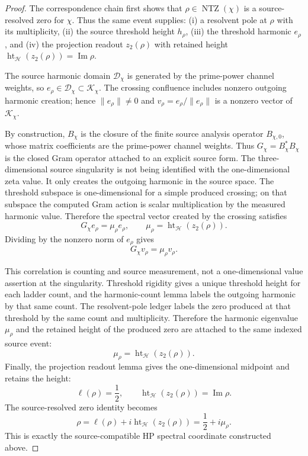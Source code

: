 \documentclass[11pt]{article}
\DeclareMathOperator{\Imm}{Im}
\DeclareMathOperator{\NTZ}{NTZ}
\DeclareMathOperator{\hgt}{ht}
\begin{document}
\begin{proof}
The correspondence chain first shows that $\rho\in\NTZ(\chi)$ is a
source-resolved zero for $\chi$.  Thus the same event supplies:
(i) a resolvent pole at $\rho$ with its multiplicity, (ii) the source threshold
height $h_\rho$, (iii) the threshold harmonic $e_\rho$, and (iv) the projection
readout $z_2(\rho)$ with retained height
$\hgt_{\mathcal H}(z_2(\rho))=\Imm\rho$.

The source harmonic domain $\mathcal D_\chi$ is generated by the prime-power
channel weights, so $e_\rho\in\mathcal D_\chi\subset\mathcal K_\chi$.  The
crossing confluence includes nonzero outgoing harmonic creation; hence
$\|e_\rho\|\ne0$ and $v_\rho=e_\rho/\|e_\rho\|$ is a nonzero vector of
$\mathcal K_\chi$.

By construction, $B_\chi$ is the closure of the finite source analysis operator
$B_{\chi,0}$, whose matrix coefficients are the prime-power channel weights.
Thus $G_\chi=B_\chi^*B_\chi$ is the closed Gram operator attached to an explicit
source form.  The three-dimensional source singularity is not being identified
with the one-dimensional zeta value.  It only creates the outgoing harmonic in
the source space.  The threshold subspace is one-dimensional for a simple
produced crossing; on that subspace the computed Gram action is scalar
multiplication by the measured harmonic value.  Therefore the spectral vector
created by the crossing satisfies
\[
  G_\chi e_\rho=\mu_\rho e_\rho,
  \qquad
  \mu_\rho=\hgt_{\mathcal H}(z_2(\rho)).
\]
Dividing by the nonzero norm of $e_\rho$ gives
\[
  G_\chi v_\rho=\mu_\rho v_\rho .
\]

This correlation is counting and source measurement, not a one-dimensional
value assertion at the singularity.  Threshold rigidity gives
a unique threshold height for each ladder count, and the harmonic-count lemma
labels the outgoing harmonic by that same count.  The resolvent-pole ledger
labels the zero produced at that threshold by the same count and multiplicity.
Therefore the harmonic eigenvalue $\mu_\rho$ and the retained height of the
produced zero are attached to the same indexed source event:
\[
  \mu_\rho=\hgt_{\mathcal H}(z_2(\rho)).
\]
Finally, the projection readout lemma gives the one-dimensional midpoint and
retains the height:
\[
  \ell(\rho)=\frac12,
  \qquad
  \hgt_{\mathcal H}(z_2(\rho))=\Imm\rho .
\]
The source-resolved zero identity becomes
\[
  \rho=\ell(\rho)+i\hgt_{\mathcal H}(z_2(\rho))
       =\frac12+i\mu_\rho .
\]
This is exactly the source-compatible HP spectral coordinate constructed above.
\end{proof}
\end{document}
